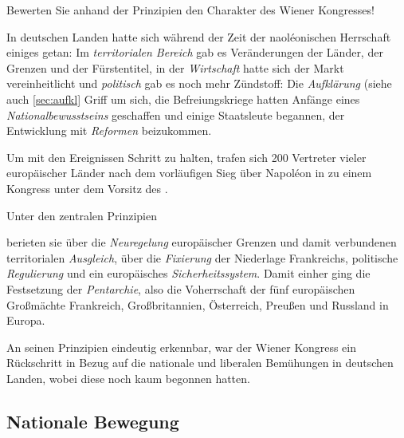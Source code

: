 \begin{aufgabe}
Bewerten Sie anhand der Prinzipien den Charakter des Wiener
Kongresses! 
\end{aufgabe}

In deutschen Landen hatte sich während der Zeit der naol\'eonischen
Herrschaft einiges getan: Im \emph{territorialen Bereich} gab es
Veränderungen der Länder, der Grenzen und der Fürstentitel, in der
\emph{Wirtschaft} hatte sich der Markt vereinheitlicht und
\emph{politisch} gab es noch mehr Zündstoff: Die \emph{Aufklärung}
(siehe auch \ref{sec:aufkl} Griff um sich, die Befreiungskriege hatten
Anfänge eines \emph{Nationalbewusstseins} geschaffen und einige
Staatsleute begannen, der Entwicklung mit \emph{Reformen} beizukommen.

Um mit den Ereignissen Schritt zu halten, trafen sich 200 Vertreter
vieler europäischer Länder nach dem vorläufigen Sieg über Napol\'eon
in  zu einem Kongress unter dem Vorsitz des .

Unter den zentralen Prinzipien

\begin{center}
\Large
\end{center}

\noindent berieten sie über die \emph{Neuregelung} europäischer
Grenzen und damit verbundenen territorialen \emph{Ausgleich}, über die
\emph{Fixierung} der Niederlage Frankreichs, politische
\emph{Regulierung} und ein europäisches
\emph{Sicherheitssystem}. Damit einher ging
die Festsetzung der \emph{Pentarchie}, also die Voherrschaft der fünf
europäischen Großmächte Frankreich, Großbritannien, Österreich, Preußen 
und Russland in Europa.

An seinen Prinzipien eindeutig erkennbar, war der Wiener Kongress ein
Rückschritt in Bezug auf die nationale und liberalen Bemühungen in
deutschen Landen, wobei diese noch kaum begonnen hatten.


\subsection{Nationale Bewegung}

